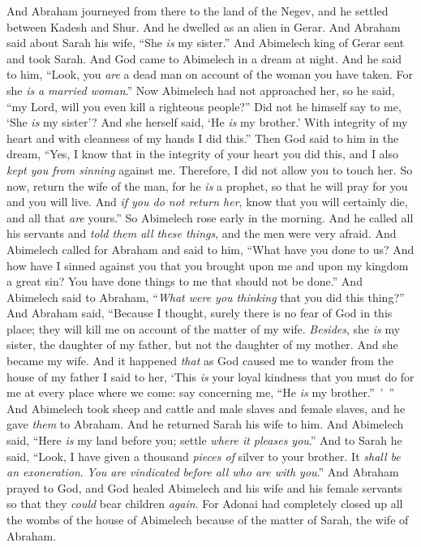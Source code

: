 \begin{biblechapter} %
 And Abraham journeyed from there to the land of the Negev, and he settled between Kadesh and Shur. And he dwelled as an alien in Gerar.
\verse And Abraham said about Sarah his wife, “She \textit{is} my sister.” And Abimelech king of Gerar sent and took Sarah.
\verse And God came to Abimelech in a dream at night. And he said to him, “Look, you \textit{are} a dead man on account of the woman you have taken. For she \textit{is} \textit{a married woman}.”
\verse Now Abimelech had not approached her, so he said, “my Lord, will you even kill a righteous people?”
\verse Did not he himself say to me, ‘She \textit{is} my sister’? And she herself said, ‘He \textit{is} my brother.’ With integrity of my heart and with cleanness of my hands I did this.”
\verse Then God said to him in the dream, “Yes, I know that in the integrity of your heart you did this, and I also \textit{kept you from sinning} against me. Therefore, I did not allow you to touch her.
\verse So now, return the wife of the man, for he \textit{is} a prophet, so that he will pray for you and you will live. And \textit{if you do not return her}, know that you will certainly die, and all that \textit{are} yours.”
\verse So Abimelech rose early in the morning. And he called all his servants and \textit{told them all these things}, and the men were very afraid.
\verse And Abimelech called for Abraham and said to him, “What have you done to us? And how have I sinned against you that you brought upon me and upon my kingdom a great sin? You have done things to me that should not be done.”
\verse And Abimelech said to Abraham, “\textit{What were you thinking} that you did this thing?”
\verse And Abraham said, “Because I thought, surely there is no fear of God in this place; they will kill me on account of the matter of my wife.
\verse \textit{Besides}, she \textit{is} my sister, the daughter of my father, but not the daughter of my mother. And she became my wife.
\verse And it happened \textit{that} as God caused me to wander from the house of my father I said to her, ‘This \textit{is} your loyal kindness that you must do for me at every place where we come: say concerning me, “He \textit{is} my brother.” ’ ”
\verse And Abimelech took sheep and cattle and male slaves and female slaves, and he gave \textit{them} to Abraham. And he returned Sarah his wife to him.
\verse And Abimelech said, “Here \textit{is} my land before you; settle \textit{where it pleases you}.”
\verse And to Sarah he said, “Look, I have given a thousand \textit{pieces of} silver to your brother. It \textit{shall be} \textit{an exoneration}. \textit{You are vindicated before all who are with you}.”
\verse And Abraham prayed to God, and God healed Abimelech and his wife and his female servants so that they \textit{could} bear children \textit{again}.
\verse For Adonai had completely closed up all the wombs of the house of Abimelech because of the matter of Sarah, the wife of Abraham.
\end{biblechapter}

